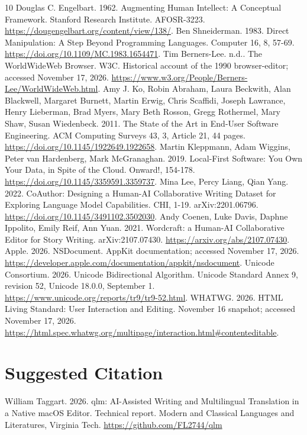 \documentclass[manuscript,screen,nonacm]{acmart}
\begin{document}
\begin{thebibliography}{10}
 Douglas C. Engelbart. 1962. Augmenting Human Intellect: A Conceptual Framework. Stanford Research Institute. AFOSR-3223. \url{https://dougengelbart.org/content/view/138/}.
 Ben Shneiderman. 1983. Direct Manipulation: A Step Beyond Programming Languages. Computer 16, 8, 57-69. \url{https://doi.org/10.1109/MC.1983.1654471}.
 Tim Berners-Lee. n.d.. The WorldWideWeb Browser. W3C. Historical account of the 1990 browser-editor; accessed November 17, 2026. \url{https://www.w3.org/People/Berners-Lee/WorldWideWeb.html}.
 Amy J. Ko, Robin Abraham, Laura Beckwith, Alan Blackwell, Margaret Burnett, Martin Erwig, Chris Scaffidi, Joseph Lawrance, Henry Lieberman, Brad Myers, Mary Beth Rosson, Gregg Rothermel, Mary Shaw, Susan Wiedenbeck. 2011. The State of the Art in End-User Software Engineering. ACM Computing Surveys 43, 3, Article 21, 44 pages. \url{https://doi.org/10.1145/1922649.1922658}.
 Martin Kleppmann, Adam Wiggins, Peter van Hardenberg, Mark McGranaghan. 2019. Local-First Software: You Own Your Data, in Spite of the Cloud. Onward!, 154-178. \url{https://doi.org/10.1145/3359591.3359737}.
 Mina Lee, Percy Liang, Qian Yang. 2022. CoAuthor: Designing a Human-AI Collaborative Writing Dataset for Exploring Language Model Capabilities. CHI, 1-19. arXiv:2201.06796. \url{https://doi.org/10.1145/3491102.3502030}.
 Andy Coenen, Luke Davis, Daphne Ippolito, Emily Reif, Ann Yuan. 2021. Wordcraft: a Human-AI Collaborative Editor for Story Writing. arXiv:2107.07430. \url{https://arxiv.org/abs/2107.07430}.
 Apple. 2026. NSDocument. AppKit documentation; accessed November 17, 2026. \url{https://developer.apple.com/documentation/appkit/nsdocument}.
 Unicode Consortium. 2026. Unicode Bidirectional Algorithm. Unicode Standard Annex 9, revision 52, Unicode 18.0.0, September 1. \url{https://www.unicode.org/reports/tr9/tr9-52.html}.
 WHATWG. 2026. HTML Living Standard: User Interaction and Editing. November 16 snapshot; accessed November 17, 2026. \url{https://html.spec.whatwg.org/multipage/interaction.html#contenteditable}.
\end{thebibliography}
\section*{Suggested Citation}
William Taggart. 2026. qlm: AI-Assisted Writing and Multilingual Translation in a Native macOS Editor. Technical report. Modern and Classical Languages and Literatures, Virginia Tech. \url{https://github.com/FL2744/qlm}
\end{document}
